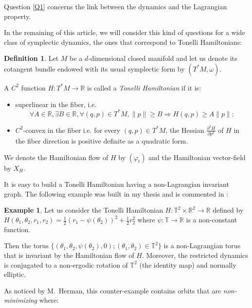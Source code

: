 \documentclass{dcds}
\theoremstyle{definition}
\newtheorem{definition}[theorem]{Definition}
\newtheorem{exa}{Example}
\begin{document}
 Question \ref{Q1} concerns the link between the dynamics and the Lagrangian property.

 In the remaining of this article, we will consider this kind of questions for a wide class of symplectic dynamics, the ones that correspond to   Tonelli Hamiltonians:

\begin{definition}
Let $M$ be a $d$-dimensional closed manifold and let us denote   its cotangent bundle endowed with its usual symplectic form  by  $(T^*M, \omega)$.

 A $C^2$ function $H: T^*M\rightarrow {\mathbb {R}}$ is called a {\em Tonelli Hamiltonian} if it is:
\begin{itemize}
\item superlinear in the fiber, i.e. $$\forall A\in {\mathbb {R}}, \exists B\in {\mathbb {R}}, \forall (q,p)\in T^*M, \| p\|\geq B\Rightarrow  H(q,p) \geq A\| p\|;$$
\item $C^2$-convex in the fiber i.e. for every $(q,p)\in T^*M$, the Hessian $\frac{\partial^2H}{\partial p^2}$ of $H$ in the fiber direction is positive definite as a quadratic form.
\end{itemize}
We denote the Hamiltonian flow of $H$ by $(\varphi_t)$ and the Hamiltonian vector-field by $X_H$.

\end{definition}
It is easy to build a Tonelli Hamiltonian having a non-Lagrangian invariant graph. The following example was built in my thesis and is commented in \cite{He1}:

\begin{exa}Let us consider the Tonelli  Hamiltonian $H:{\mathbb {T}}^2\times {\mathbb {R}}^2\rightarrow {\mathbb {R}}$ defined by $H(\theta_1, \theta_2, r_1, r_2)=\frac{1}{2}(r_1-\psi (\theta_2))^2+\frac{1}{2}r_2^2$ where $\psi:{\mathbb {T}}\rightarrow {\mathbb {R}}$ is a non-constant function.
\medskip

Then the torus $\{(\theta_1, \theta_2, \psi(\theta_2), 0); (\theta_1, \theta_2)\in{\mathbb {T}}^2\}$ is a non-Lagrangian torus that is invariant by the Hamiltonian flow of $H$. Moreover, the restricted dynamics is conjugated to a non-ergodic rotation of ${\mathbb {T}}^2$ (the identity map) and normally elliptic.
\end{exa}

As noticed by M.~Herman, this counter-example contains orbits that are {\em non-minimizing} where:
\end{document}
